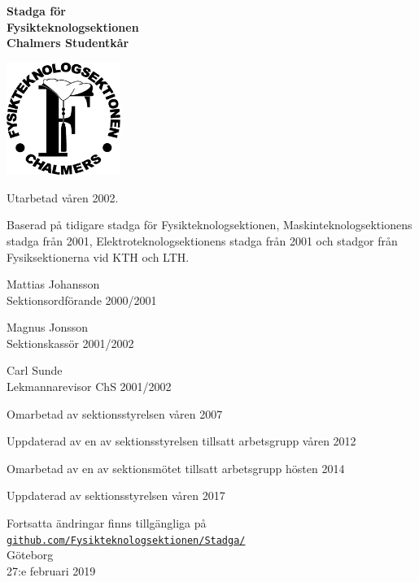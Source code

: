 \documentclass[11pt,a4paper]{article}
\begin{document}

\setlength{\headheight}{14pt}
\begin{center}
  \textbf{\Huge{Stadga för}}\\[3mm]
  \textbf{\Huge{Fysikteknologsektionen}}\\
  \vspace{.7 cm}
  \textbf{\Large{Chalmers Studentkår}}

  \vspace{1.25em}
  \includegraphics[width=10em]{sektionslogo.eps}
  \vspace{1.25em}

  Utarbetad våren 2002.
  
  Baserad på tidigare stadga för Fysikteknologsektionen, Maskinteknologsektionens stadga från 2001, Elektroteknologsektionens stadga från 2001 och stadgor från Fysiksektionerna vid KTH och LTH\@.
  
  Mattias Johansson\\
  Sektionsordförande 2000/2001

  Magnus Jonsson\\
  Sektionskassör 2001/2002

  Carl Sunde\\
  Lekmannarevisor ChS 2001/2002
  
  Omarbetad av sektionsstyrelsen våren 2007
  
  Uppdaterad av en av sektionsstyrelsen tillsatt arbetsgrupp våren 2012

  Omarbetad av en av sektionsmötet tillsatt arbetsgrupp hösten 2014
  
  Uppdaterad av sektionsstyrelsen våren 2017

  Fortsatta ändringar finns tillgängliga på\\
  \href{https://github.com/Fysikteknologsektionen/Stadga/commits/master}{\texttt{github.com/Fysikteknologsektionen/Stadga/}}\\[5mm]

  \small{Göteborg}\\
  \small{27:e februari 2019}
\end{center}
\end{document}
